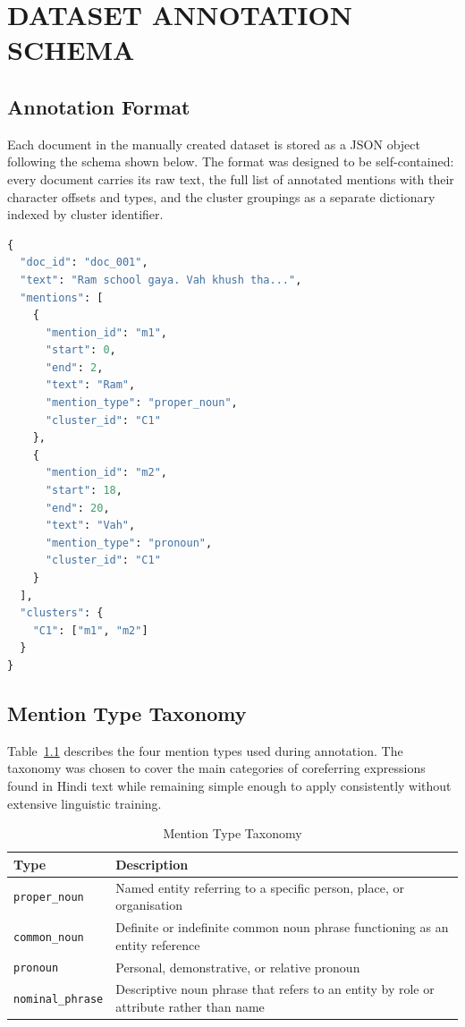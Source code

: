 \documentclass[12pt,a4paper]{report}
\begin{document}
\chapter{DATASET ANNOTATION SCHEMA}

\section{Annotation Format}

Each document in the manually created dataset is stored as a JSON object following the schema shown below. The format was designed to be self-contained: every document carries its raw text, the full list of annotated mentions with their character offsets and types, and the cluster groupings as a separate dictionary indexed by cluster identifier.

\begin{lstlisting}[language=Python, caption={Dataset Annotation Schema (JSON)}]
{
  "doc_id": "doc_001",
  "text": "Ram school gaya. Vah khush tha...",
  "mentions": [
    {
      "mention_id": "m1",
      "start": 0,
      "end": 2,
      "text": "Ram",
      "mention_type": "proper_noun",
      "cluster_id": "C1"
    },
    {
      "mention_id": "m2",
      "start": 18,
      "end": 20,
      "text": "Vah",
      "mention_type": "pronoun",
      "cluster_id": "C1"
    }
  ],
  "clusters": {
    "C1": ["m1", "m2"]
  }
}
\end{lstlisting}

\section{Mention Type Taxonomy}

Table~\ref{tab:mention_types} describes the four mention types used during annotation. The taxonomy was chosen to cover the main categories of coreferring expressions found in Hindi text while remaining simple enough to apply consistently without extensive linguistic training.

\begin{table}[H]
\centering
\caption{Mention Type Taxonomy}
\label{tab:mention_types}
\begin{tabular}{|l|p{9cm}|}
\hline
\textbf{Type} & \textbf{Description} \\
\hline
\texttt{proper\_noun} & Named entity referring to a specific person, place, or organisation \\
\texttt{common\_noun} & Definite or indefinite common noun phrase functioning as an entity reference \\
\texttt{pronoun} & Personal, demonstrative, or relative pronoun \\
\texttt{nominal\_phrase} & Descriptive noun phrase that refers to an entity by role or attribute rather than name \\
\hline
\end{tabular}
\end{table}
\end{document}
